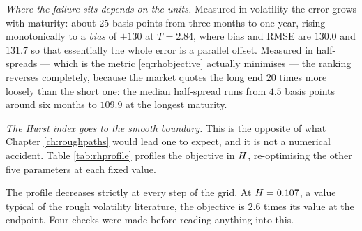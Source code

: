 \emph{Where the failure sits depends on the units.} Measured in
volatility the error grows with maturity: about $25$ basis points from three months to one year,
rising monotonically to a \emph{bias} of $+130$ at $T=2.84$, where bias and RMSE are $130.0$ and
$131.7$ so that essentially the whole error is a parallel offset. Measured in half-spreads --- which
is the metric \eqref{eq:rhobjective} actually minimises --- the ranking reverses completely, because
the market quotes the long end $20$ times more loosely than the short one: the median half-spread runs
from $4.5$ basis points around six months to $109.9$ at the longest maturity. 

\emph{The Hurst index goes to the smooth boundary.} This is the opposite of what Chapter
\ref{ch:roughpaths} would lead one to expect, and it is not a numerical accident. Table
\ref{tab:rhprofile} profiles the objective in $H$, re-optimising the other five parameters at
each fixed value.

The profile decreases strictly at every step of the grid. At $H=0.107$, a value typical of the
rough volatility literature, the objective is $2.6$ times its value at the endpoint. Four checks
were made before reading anything into this.





